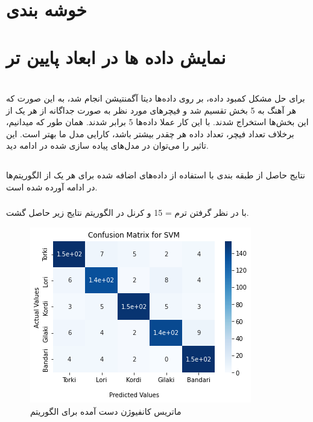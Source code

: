 \section{خوشه بندی}

\section{نمایش داده ها در ابعاد پایین تر} 





\section{}
برای حل مشکل کمبود داده، بر روی داده‌ها دیتا آگمنتیشن انجام شد، به این صورت که هر آهنگ به 5 بخش تقسیم شد و فیچرهای مورد نظر 
به صورت جداگانه از هر یک از این بخش‌ها استخراج شدند. با این کار عملا داده‌ها 5 برابر شدند. همان طور که میدانیم، برخلاف تعداد فیچر،
تعداد داده هر چقدر بیشتر باشد، کارایی مدل ما بهتر است.
این تاثیر را می‌توان در مدل‌های پیاده سازی شده در ادامه دید.

\subsection{}
نتایج حاصل از طبقه بندی با استفاده از داده‌های اضافه شده برای هر یک از الگوریتم‌ها در ادامه آورده شده است.

\subsubsection{}
با در نظر گرفتن ترم  = 15 و 
کرنل  در الگوریتم 
نتایج زیر حاصل گشت.



\begin{figure}[h!]
	\centering
	\includegraphics[width=1\linewidth]{images/svm_cm_augment.png}
	\caption{ماتریس کانفیوژن دست آمده برای الگوریتم }
	\label{fig:svm_cm_augment}
\end{figure}


